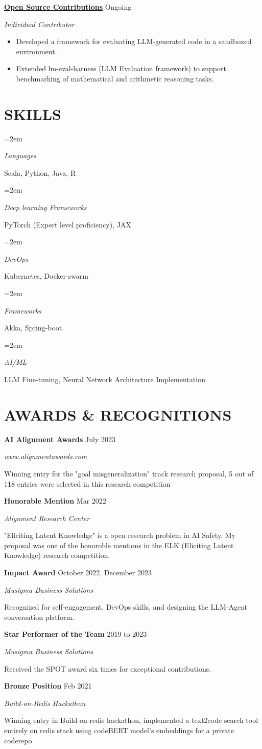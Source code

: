 \documentclass[fontsize=11pt]{article}
\newlength{\spacebox}
\newcommand{\sepspace}{\vspace*{1em}}
\newcommand{\NewPart}[1]{\section*{\uppercase{#1}}}
\newcommand{\SkillsEntry}[2]{
    \noindent\hangindent=2em\hangafter=0
    \parbox{\spacebox}{\textit{#1}}
    \hspace{1.5em} #2 \par}
\newcommand{\ProjectEntry}[4]{
    \noindent \textbf{#1} \hfill {#2} \par
    \noindent \textit{#3} \par
    \noindent \small #4
    \normalsize \par}
\newcommand{\AwardEntry}[4]{
    \noindent \textbf{#1} \hfill {#2} \par
    \noindent \textit{#3} \par
    \noindent \small #4
    \normalsize \par}
\begin{document}
\sepspace

\ProjectEntry{\href{https://github.com/rokosbasilisk/code-eval-harness}{Open Source Contributions}}{Ongoing}{Individual Contributor}
{%
\begin{itemize}
\item Developed a framework for evaluating LLM-generated code in a sandboxed environment.
\item Extended lm-eval-harness (LLM Evaluation framework) to support benchmarking of mathematical and arithmetic reasoning tasks.
\end{itemize}}

\NewPart{SKILLS}
\SkillsEntry{Languages}{Scala, Python, Java, R}
\SkillsEntry{Deep learning Frameworks}{PyTorch (Expert level proficiency), JAX}
\SkillsEntry{DevOps}{Kubernetes, Docker-swarm}
\SkillsEntry{Frameworks}{Akka, Spring-boot}
\SkillsEntry{AI/ML}{LLM Fine-tuning, Neural Network Architecture Implementation}

\NewPart{AWARDS \& RECOGNITIONS}

\AwardEntry{AI Alignment Awards}{July 2023}{www.alignmentawards.com}
{Winning entry for the "goal misgeneralization" track research proposal, 5 out of 118 entries were selected in this research competition}

\sepspace

\AwardEntry{Honorable Mention}{Mar 2022}{Alignment Research Center}
{"Eliciting Latent Knowledge" is a open research problem in AI Safety, My proposal was one of the honoroble mentions in the ELK (Eliciting Latent Knowledge) research competition.}

\sepspace

\AwardEntry{Impact Award}{October 2022, December 2023}{Musigma Business Solutions}
{Recognized for self-engagement, DevOps skills, and designing the LLM-Agent conversation platform.}

\sepspace

\AwardEntry{Star Performer of the Team}{2019 to 2023}{Musigma Business Solutions}
{Received the SPOT award six times for exceptional contributions.}

\sepspace

\AwardEntry{Bronze Position}{Feb 2021}{Build-on-Redis Hackathon}
{Winning entry in Build-on-redis hackathon, implemented a text2code search tool entirely on redis stack using codeBERT model's embeddings for a private coderepo}
\end{document}
